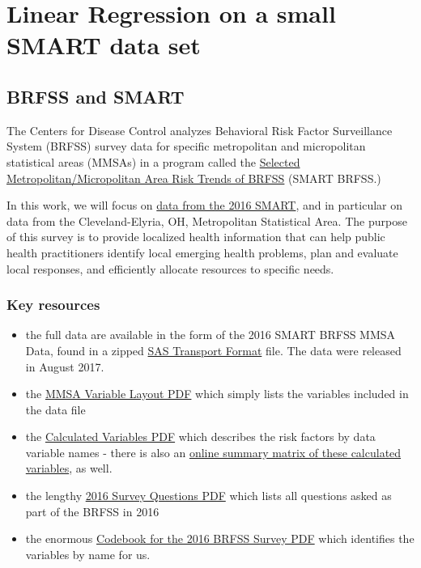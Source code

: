 \documentclass[]{book}
\providecommand{\tightlist}{%
  \setlength{\itemsep}{0pt}\setlength{\parskip}{0pt}}
\theoremstyle{definition}
\theoremstyle{definition}
\theoremstyle{definition}
\theoremstyle{remark}
\begin{document}
\chapter{Linear Regression on a small SMART data
set}\label{linear-regression-on-a-small-smart-data-set}

\section{BRFSS and SMART}\label{brfss-and-smart}

The Centers for Disease Control analyzes Behavioral Risk Factor
Surveillance System (BRFSS) survey data for specific metropolitan and
micropolitan statistical areas (MMSAs) in a program called the
\href{https://www.cdc.gov/brfss/smart/Smart_data.htm}{Selected
Metropolitan/Micropolitan Area Risk Trends of BRFSS} (SMART BRFSS.)

In this work, we will focus on
\href{https://www.cdc.gov/brfss/smart/smart_2016.html}{data from the
2016 SMART}, and in particular on data from the Cleveland-Elyria, OH,
Metropolitan Statistical Area. The purpose of this survey is to provide
localized health information that can help public health practitioners
identify local emerging health problems, plan and evaluate local
responses, and efficiently allocate resources to specific needs.

\subsection{Key resources}\label{key-resources}

\begin{itemize}
\tightlist
\item
  the full data are available in the form of the 2016 SMART BRFSS MMSA
  Data, found in a zipped
  \href{https://www.cdc.gov/brfss/smart/2016/MMSA2016_XPT.zip}{SAS
  Transport Format} file. The data were released in August 2017.
\item
  the
  \href{https://www.cdc.gov/brfss/smart/2016/mmsa_varlayout_16.pdf}{MMSA
  Variable Layout PDF} which simply lists the variables included in the
  data file
\item
  the
  \href{https://www.cdc.gov/brfss/annual_data/2016/pdf/2016_calculated_variables_version4.pdf}{Calculated
  Variables PDF} which describes the risk factors by data variable names
  - there is also an
  \href{https://www.cdc.gov/brfss/annual_data/2016/Summary_Matrix_16.html}{online
  summary matrix of these calculated variables}, as well.
\item
  the lengthy
  \href{https://www.cdc.gov/brfss/questionnaires/pdf-ques/2016_BRFSS_Questionnaire_FINAL.pdf}{2016
  Survey Questions PDF} which lists all questions asked as part of the
  BRFSS in 2016
\item
  the enormous
  \href{https://www.cdc.gov/brfss/annual_data/2016/pdf/codebook16_llcp.pdf}{Codebook
  for the 2016 BRFSS Survey PDF} which identifies the variables by name
  for us.
\end{itemize}
\end{document}
